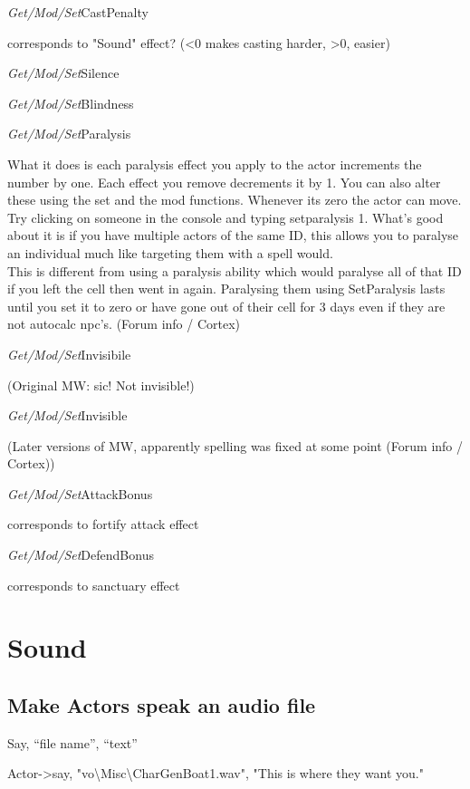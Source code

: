 \documentclass[
]{article}
\begin{document}
\emph{Get/Mod/Set}CastPenalty

corresponds to "Sound" effect? (\textless0 makes casting harder,
\textgreater0, easier)

\emph{Get/Mod/Set}Silence

\emph{Get/Mod/Set}Blindness

\emph{Get/Mod/Set}Paralysis

What it does is each paralysis effect you apply to the actor increments
the number by one. Each effect you remove decrements it by 1. You can
also alter these using the set and the mod functions. Whenever its zero
the actor can move. Try clicking on someone in the console and typing
setparalysis 1. What's good about it is if you have multiple actors of
the same ID, this allows you to paralyse an individual much like
targeting them with a spell would.\\
This is different from using a paralysis ability which would paralyse
all of that ID if you left the cell then went in again. Paralysing them
using SetParalysis lasts until you set it to zero or have gone out of
their cell for 3 days even if they are not autocalc npc's. (Forum info /
Cortex)

\emph{Get/Mod/Set}Invisibile

(Original MW: sic! Not invisible!)

\emph{Get/Mod/Set}Invisible

(Later versions of MW, apparently spelling was fixed at some point
(Forum info / Cortex))

\emph{Get/Mod/Set}AttackBonus

corresponds to fortify attack effect

\emph{Get/Mod/Set}DefendBonus

corresponds to sanctuary effect

\hypertarget{sound}{%
\section{\texorpdfstring{\hfill\break
Sound}{ Sound}}\label{sound}}

\hypertarget{make-actors-speak-an-audio-file}{%
\subsection{Make Actors speak an audio
file}\label{make-actors-speak-an-audio-file}}

Say, ``file name'', ``text''

Actor-\textgreater say,
"vo\textbackslash Misc\textbackslash CharGenBoat1.wav", "This is where
they want you."
\end{document}
